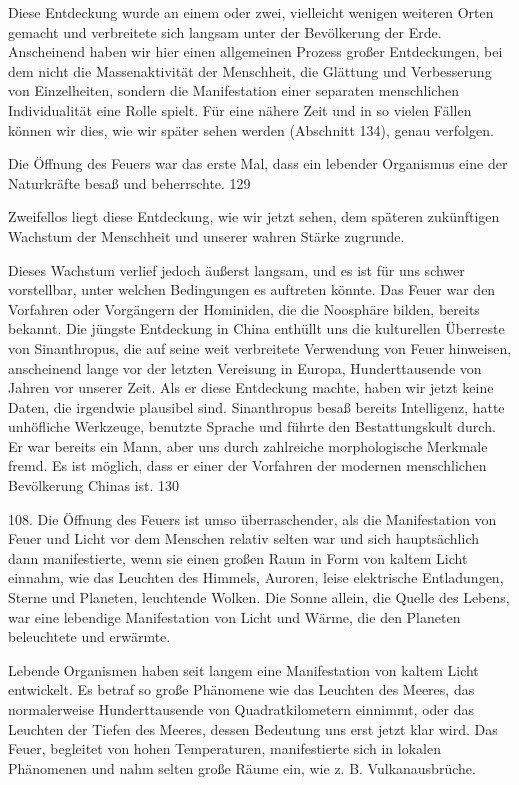 \documentclass[11pt,a4paper]{book}
\begin{document}
Diese Entdeckung wurde an einem oder zwei, vielleicht wenigen weiteren Orten gemacht und verbreitete sich langsam unter der Bevölkerung der Erde. Anscheinend haben wir hier einen allgemeinen Prozess großer Entdeckungen, bei dem nicht die Massenaktivität der Menschheit, die Glättung und Verbesserung von Einzelheiten, sondern die Manifestation einer separaten menschlichen Individualität eine Rolle spielt. Für eine nähere Zeit und in so vielen Fällen können wir dies, wie wir später sehen werden (Abschnitt 134), genau verfolgen.



Die Öffnung des Feuers war das erste Mal, dass ein lebender Organismus eine der Naturkräfte besaß und beherrschte. 129



Zweifellos liegt diese Entdeckung, wie wir jetzt sehen, dem späteren zukünftigen Wachstum der Menschheit und unserer wahren Stärke zugrunde.



Dieses Wachstum verlief jedoch äußerst langsam, und es ist für uns schwer vorstellbar, unter welchen Bedingungen es auftreten könnte. Das Feuer war den Vorfahren oder Vorgängern der Hominiden, die die Noosphäre bilden, bereits bekannt. Die jüngste Entdeckung in China enthüllt uns die kulturellen Überreste von Sinanthropus, die auf seine weit verbreitete Verwendung von Feuer hinweisen, anscheinend lange vor der letzten Vereisung in Europa, Hunderttausende von Jahren vor unserer Zeit. Als er diese Entdeckung machte, haben wir jetzt keine Daten, die irgendwie plausibel sind. Sinanthropus besaß bereits Intelligenz, hatte unhöfliche Werkzeuge, benutzte Sprache und führte den Bestattungskult durch. Er war bereits ein Mann, aber uns durch zahlreiche morphologische Merkmale fremd. Es ist möglich, dass er einer der Vorfahren der modernen menschlichen Bevölkerung Chinas ist. 130



108. Die Öffnung des Feuers ist umso überraschender, als die Manifestation von Feuer und Licht vor dem Menschen relativ selten war und sich hauptsächlich dann manifestierte, wenn sie einen großen Raum in Form von kaltem Licht einnahm, wie das Leuchten des Himmels, Auroren, leise elektrische Entladungen, Sterne und Planeten, leuchtende Wolken. Die Sonne allein, die Quelle des Lebens, war eine lebendige Manifestation von Licht und Wärme, die den Planeten beleuchtete und erwärmte.



Lebende Organismen haben seit langem eine Manifestation von kaltem Licht entwickelt. Es betraf so große Phänomene wie das Leuchten des Meeres, das normalerweise Hunderttausende von Quadratkilometern einnimmt, oder das Leuchten der Tiefen des Meeres, dessen Bedeutung uns erst jetzt klar wird. Das Feuer, begleitet von hohen Temperaturen, manifestierte sich in lokalen Phänomenen und nahm selten große Räume ein, wie z. B. Vulkanausbrüche.
\end{document}
